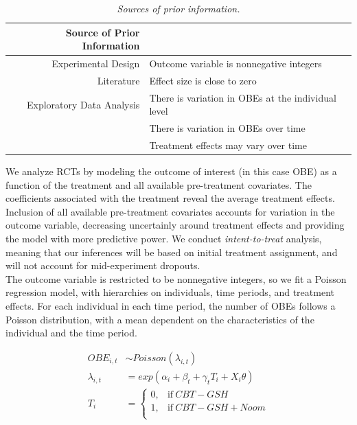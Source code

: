 \documentclass[12pt, oneside]{article}
\begin{document}
\begin{table}[t]
\centering
\begin{tabular}{r l}
  Source of Prior Information &  \\ 
  \hline  \vspace{0.25em}
  Experimental Design & Outcome variable is nonnegative integers \\
  \vspace{0.25em}
  Literature & Effect size is close to zero \\
  Exploratory Data Analysis & There is variation in OBEs at the individual level \\
					  & There is variation in OBEs over time \\
                                            & Treatment effects may vary over time \\
    \hline
\end{tabular}
\caption{\emph{Sources of prior information.}}
\end{table}


We analyze RCTs by modeling the outcome of interest (in this case OBE) as a function of the treatment and all available pre-treatment covariates.  The coefficients associated with the treatment reveal the average treatment effects.  Inclusion of all available pre-treatment covariates accounts for variation in the outcome variable, decreasing uncertainly around treatment effects and providing the model with more predictive power.  We conduct \emph{intent-to-treat} analysis, meaning that our inferences will be based on initial treatment assignment, and will not account for mid-experiment dropouts.  
\\

The outcome variable is restricted to be nonnegative integers, so we fit a Poisson regression model, with hierarchies on individuals, time periods, and treatment effects.  For each individual in each time period, the number of OBEs follows a Poisson distribution, with a mean dependent on the characteristics of the individual and the time period.  

\begin{align}
OBE_{i,t} &\sim Poisson(\lambda_{i,t}) \\
\lambda_{i,t} &= exp(\alpha_i + \beta_t + \gamma_tT_i + X_i\theta) \\
T_i &=
    \begin{cases}
      0, & \text{if}\ CBT-GSH \\
      1, & \text{if}\ CBT-GSH + Noom \\
    \end{cases}
\end{align}
\end{document}
